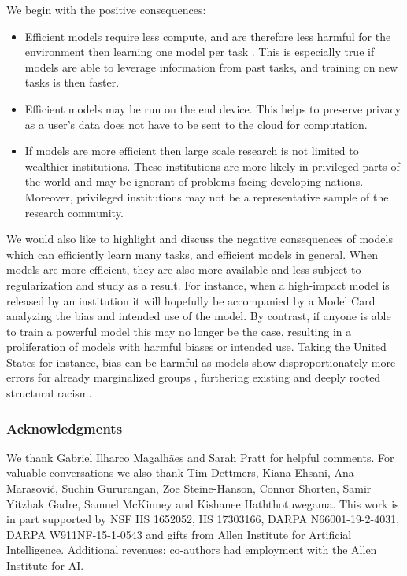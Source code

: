\documentclass{article}
\begin{document}
We begin with the positive consequences:
\begin{itemize}
    \item Efficient models require less compute, and are therefore less harmful for the environment then learning one model per task \cite{schwartz2019green}. This is especially true if models are able to leverage information from past tasks, and training on new tasks is then faster.
    \item Efficient models may be run on the end device. This helps to preserve privacy as a user's data does not have to be sent to the cloud for computation.
    \item If models are more efficient then large scale research is not limited to wealthier institutions. These institutions are more likely in privileged parts of the world and may be ignorant of problems facing developing nations. Moreover, privileged institutions may not be a representative sample of the research community.
\end{itemize}
We would also like to highlight and discuss the negative consequences of models which can efficiently learn many tasks, and efficient models in general. When models are more efficient, they are also more available and less subject to regularization and study as a result. For instance, when a high-impact model is released by an institution it will hopefully be accompanied by a Model Card \cite{mitchell2019model} analyzing the bias and intended use of the model. By contrast, if anyone is able to train a powerful model this may no longer be the case, resulting in a proliferation of models with harmful biases or intended use. Taking the United States for instance, bias can be harmful as models show disproportionately more errors for already marginalized groups \cite{buolamwini2018gender}, furthering existing and deeply rooted structural racism.

\subsubsection*{Acknowledgments}
We thank Gabriel Ilharco Magalhães and Sarah Pratt for helpful comments. For valuable conversations we also thank Tim Dettmers, Kiana Ehsani, Ana Marasović, Suchin Gururangan, Zoe Steine-Hanson, Connor Shorten, Samir Yitzhak Gadre, Samuel McKinney and Kishanee Haththotuwegama. This work is in part supported by NSF IIS 1652052, IIS 17303166, DARPA N66001-19-2-4031, DARPA W911NF-15-1-0543 and gifts from Allen Institute for Artificial Intelligence. Additional revenues: co-authors had employment with the Allen Institute for AI.
\end{document}

